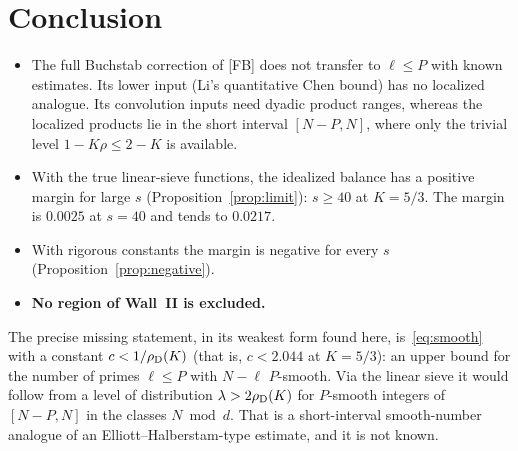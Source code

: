 \documentclass[11pt,a4paper]{article}
\theoremstyle{remark}
\begin{document}
\section{Conclusion}
\begin{itemize}
\item The full Buchstab correction of [FB] does not transfer to $\ell\le P$ with known estimates. Its
lower input (Li's quantitative Chen bound) has no localized analogue. Its convolution inputs need
dyadic product ranges, whereas the localized products lie in the short interval $[N-P,N]$, where
only the trivial level $1-K\rho\le2-K$ is available.
\item With the true linear-sieve functions, the idealized balance has a positive margin for large $s$
(Proposition~\ref{prop:limit}): $s\ge40$ at $K=5/3$. The margin is $0.0025$ at $s=40$ and tends to $0.0217$.
\item With rigorous constants the margin is negative for every $s$ (Proposition~\ref{prop:negative}).
\item \textbf{No region of Wall~II is excluded.}
\end{itemize}
The precise missing statement, in its weakest form found here, is~\eqref{eq:smooth} with a constant
$c<1/\rho_{\rm D}(K)$ (that is, $c<2.044$ at $K=5/3$): an upper bound for the number of primes $\ell\le P$ with
$N-\ell$ $P$-smooth. Via the linear sieve it would follow from a level of distribution
$\lambda>2\rho_{\rm D}(K)$ for $P$-smooth integers of $[N-P,N]$ in the classes $N\bmod d$. That is a short-interval
smooth-number analogue of an Elliott--Halberstam-type estimate, and it is not known.
\end{document}
